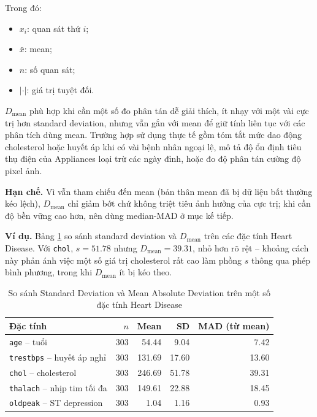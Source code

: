 Trong đó:
\begin{itemize}[leftmargin=1.6em,label=\textbullet]
 \item $x_i$: quan sát thứ $i$;
 \item $\bar{x}$: mean;
 \item $n$: số quan sát;
 \item $\lvert \cdot \rvert$: giá trị tuyệt đối.
\end{itemize}

$D_{\text{mean}}$ phù hợp khi cần một số đo phân tán dễ giải thích, ít nhạy với một vài cực trị hơn standard deviation, nhưng vẫn gắn với mean để giữ tính liên tục với các phân tích dùng mean. Trường hợp sử dụng thực tế gồm tóm tắt mức dao động cholesterol hoặc huyết áp khi có vài bệnh nhân ngoại lệ, mô tả độ ổn định tiêu thụ điện của Appliances loại trừ các ngày đỉnh, hoặc đo độ phân tán cường độ pixel ảnh.

\textbf{Hạn chế.} Vì vẫn tham chiếu đến mean (bản thân mean đã bị dữ liệu bất thường kéo lệch), $D_{\text{mean}}$ chỉ giảm bớt chứ không triệt tiêu ảnh hưởng của cực trị; khi cần độ bền vững cao hơn, nên dùng median-MAD ở mục kế tiếp.

\textbf{Ví dụ.} Bảng \ref{tab:chapter1_mad_mean_example} so sánh standard deviation và $D_{\text{mean}}$ trên các đặc tính Heart Disease. Với \texttt{chol}, $s=51.78$ nhưng $D_{\text{mean}}=39.31$, nhỏ hơn rõ rệt -- khoảng cách này phản ánh việc một số giá trị cholesterol rất cao làm phồng $s$ thông qua phép bình phương, trong khi $D_{\text{mean}}$ ít bị kéo theo.

\begin{table}[H]
\centering
\caption{So sánh Standard Deviation và Mean Absolute Deviation trên một số đặc tính Heart Disease}
\label{tab:chapter1_mad_mean_example}
\small
\begin{tabular}{lrrrr}
\toprule
Đặc tính & $n$ & Mean & SD & MAD (từ mean) \\
\midrule
\texttt{age} -- tuổi & 303 & 54.44 & 9.04 & 7.42 \\
\texttt{trestbps} -- huyết áp nghỉ & 303 & 131.69 & 17.60 & 13.60 \\
\texttt{chol} -- cholesterol & 303 & 246.69 & 51.78 & 39.31 \\
\texttt{thalach} -- nhịp tim tối đa & 303 & 149.61 & 22.88 & 18.45 \\
\texttt{oldpeak} -- ST depression & 303 & 1.04 & 1.16 & 0.93 \\
\bottomrule
\end{tabular}
\end{table}

